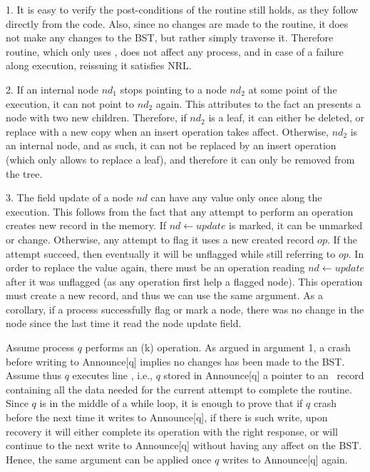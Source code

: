 \newcommand{\argSearch}{argument 1}
1. It is easy to verify the post-conditions of the  routine still holds, as they follow directly from the code. Also, since no changes are made to the  routine, it does not make any changes to the BST, but rather simply traverse it. Therefore  routine, which only uses , does not affect any process, and in case of a failure along  execution, reissuing it satisfies NRL.

\newcommand{\argNodeRef}{argument 2}
2. If an internal node $nd_1$ stops pointing to a node $nd_2$ at some point of the execution, it can not point to $nd_2$ again. This attributes to the fact an  presents a node with two new children. Therefore, if $nd_2$ is a leaf, it can either be deleted, or replace with a new copy when an insert operation takes affect. Otherwise, $nd_2$ is an internal node, and as such, it can not be replaced by an insert operation (which only allows to replace a leaf), and therefore it can only be removed from the tree.

\newcommand{\argNodeUpdate}{argument 3}
3. The field update of a node $nd$ can have any value only once along the execution. This follows from the fact that any attempt to perform an operation creates new record in the memory. If $nd\leftarrow update$ is marked, it can be unmarked or change. Otherwise, any attempt to flag it uses a new created record $op$. If the attempt succeed, then eventually it will be unflagged while still referring to $op$. In order to replace the value again, there must be an operation reading $nd\leftarrow update$ after it was unflagged (as any operation first help a flagged node). This operation must create a new record, and thus we can use the same argument. As a corollary, if a process successfully flag or mark a node, there was no change in the node since the last time it read the node update field.



Assume process $q$ performs an (k) operation. As argued in \argSearch, a crash before writing to Announce[q] implies no changes has been made to the BST. Assume thus $q$ executes line , i.e., $q$ stored in Announce[q] a pointer to an \IFlag\ record containing all the data needed for the current attempt to complete the  routine. Since $q$ is in the middle of a while loop, it is enough to prove that if $q$ crash before the next time it writes to Announce[q], if there is such write, upon recovery it will either complete its operation with the right response, or will continue to the next write to Announce[q] without having any affect on the BST. Hence, the same argument can be applied once $q$ writes to Announce[q] again.

